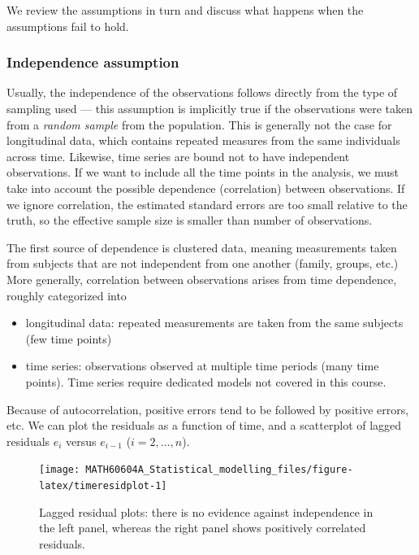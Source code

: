 \documentclass[
  11pt,
  letterpaper,
]{book}
\providecommand{\tightlist}{%
  \setlength{\itemsep}{0pt}\setlength{\parskip}{0pt}}
\theoremstyle{definition}
\theoremstyle{definition}
\theoremstyle{definition}
\theoremstyle{definition}
\theoremstyle{remark}
\begin{document}
We review the assumptions in turn and discuss what happens when the assumptions fail to hold.

\hypertarget{independence-assumption}{%
\subsubsection{Independence assumption}\label{independence-assumption}}

Usually, the independence of the observations follows directly from the type of sampling used --- this assumption is implicitly true if the observations were taken from a \emph{random sample} from the population. This is generally not the case for longitudinal data, which contains repeated measures from the same individuals across time. Likewise, time series are bound not to have independent observations. If we want to include all the time points in the analysis, we must take into account the possible dependence (correlation) between observations. If we ignore correlation, the estimated standard errors are too small relative to the truth, so the effective sample size is smaller than number of observations.

The first source of dependence is clustered data, meaning measurements taken from subjects that are not independent from one another (family, groups, etc.)
More generally, correlation between observations arises from time dependence, roughly categorized into

\begin{itemize}
\tightlist
\item
  longitudinal data: repeated measurements are taken from the same subjects (few time points)
\item
  time series: observations observed at multiple time periods (many time points). Time series require dedicated models not covered in this course.
\end{itemize}

Because of autocorrelation, positive errors tend to be followed by positive errors, etc. We can plot the residuals as a function of time, and a scatterplot of lagged residuals \(e_i\) versus \(e_{i-1}\) (\(i=2, \ldots, n\)).

\begin{figure}

{\centering \texttt{[image: MATH60604A\_Statistical\_modelling\_files/figure-latex/timeresidplot-1]} 

}

\caption{Lagged residual plots: there is no evidence against independence in the left panel, whereas the right panel shows positively correlated residuals.}\label{fig:timeresidplot}
\end{figure}
\end{document}
